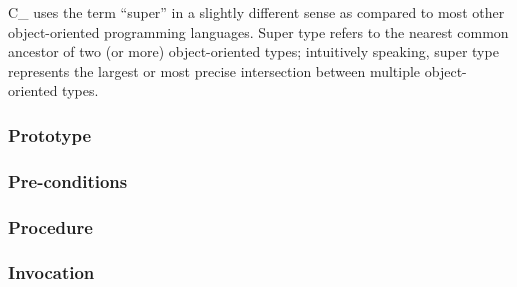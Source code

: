 \def\Subsubsection#1{\subsubsection{#1}
}

C\_ uses the term ``super'' in a slightly different sense as
compared to most other object-oriented programming languages.
Super type refers to the nearest common ancestor of two (or more)
object-oriented types; intuitively speaking, super type represents the
largest or most precise intersection between multiple object-oriented types.

\Subsubsection{Prototype}

\Subsubsection{Pre-conditions}

\Subsubsection{Procedure}

\Subsubsection{Invocation}
